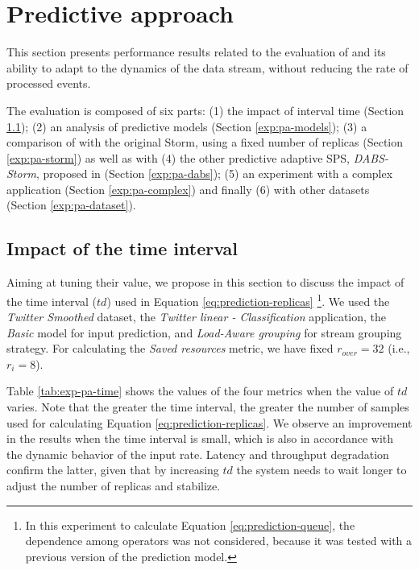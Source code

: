 \section{Predictive approach}
\label{exp:predictive}

This section presents performance results related to the evaluation of \pSPS{} and its ability to adapt to the dynamics of the data stream, without reducing the rate of processed events.

The evaluation is composed of six parts: (1) the impact of interval time (Section \ref{exp:pa-time}); (2) an analysis of predictive models (Section \ref{exp:pa-models}); (3) a comparison of \pSPS{} with the original Storm, using a fixed number of replicas (Section \ref{exp:pa-storm}) as well as with (4) the other predictive adaptive SPS, \textit{DABS-Storm}, proposed in \cite{KombiLLRB19} (Section \ref{exp:pa-dabs}); (5) an experiment with a complex application (Section \ref{exp:pa-complex}) and finally (6) with other datasets (Section \ref{exp:pa-dataset}).

\subsection{Impact of the time interval}
\label{exp:pa-time}
Aiming at tuning their value, we propose in this section to discuss the impact of the time interval ($td$) used in Equation \ref{eq:prediction-replicas} \footnote{In this experiment to calculate Equation \ref{eq:prediction-queue}, the dependence among operators was not considered, because it was tested with a previous version of the prediction model.}. We used the \textit{Twitter Smoothed} dataset, the \textit{Twitter linear - Classification} application, the \textit{Basic} model for input prediction, and \textit{Load-Aware grouping} for stream grouping strategy. For calculating the \textit{Saved resources} metric, we have fixed $r_{over} = 32$ (i.e., $r_i = 8$).


Table \ref{tab:exp-pa-time} shows the values of the four metrics when the value of $td$ varies.
Note that the greater the time interval, the greater the number of samples used for calculating Equation \ref{eq:prediction-replicas}. We observe an improvement in the results when the time interval is small, which is also in accordance with the dynamic behavior of the input rate. Latency and throughput degradation confirm the latter, given that by increasing $td$ the system needs to wait longer to adjust the number of replicas and stabilize. 

